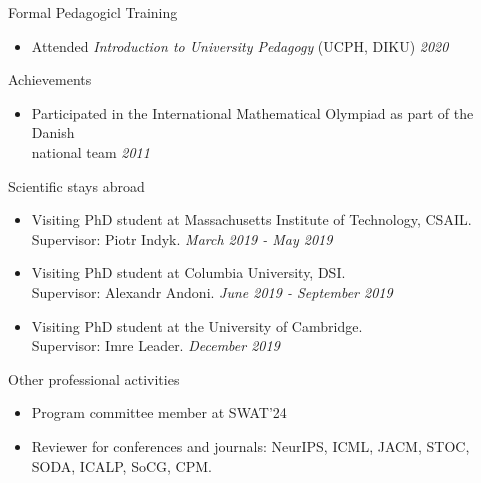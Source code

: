 \documentclass{resume} %
\begin{document}
 \begin{rSection}{Formal Pedagogicl Training}
 \begin{itemize}
  \item  Attended \emph{Introduction to University Pedagogy} (UCPH, DIKU) \hfill{\emph{2020}}
 \end{itemize}
 \end{rSection}

\begin{rSection}{Achievements}
\begin{itemize}
\item Participated in the International Mathematical Olympiad as part of the Danish \\ national team  \hfill{\emph{2011}}
\end{itemize}
\end{rSection}


\begin{rSection}{Scientific stays abroad}
\begin{itemize}
\item Visiting PhD student at Massachusetts Institute of Technology, CSAIL. \\Supervisor: Piotr Indyk. \hfill{\emph{March 2019 - May 2019}}
\item Visiting PhD student at Columbia University, DSI. \\ Supervisor: Alexandr Andoni. \hfill{\emph{June 2019 - September 2019}}
\item Visiting PhD student at the University of Cambridge.  \\Supervisor: Imre Leader. \hfill{\emph{December 2019}}
\end{itemize}

\end{rSection}


\begin{rSection}{Other professional activities}
\begin{itemize}
\item Program committee member at SWAT'24
\item Reviewer for conferences and journals: NeurIPS, ICML, JACM, STOC, SODA, ICALP, SoCG, CPM.
\end{itemize}

\end{rSection}
\end{document}
